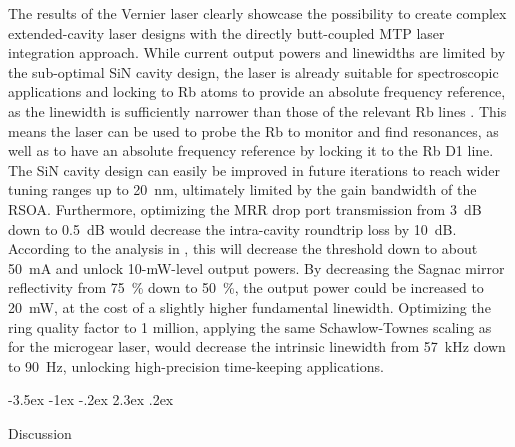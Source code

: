 \documentclass[%
 reprint,
 amsmath,amssymb,
 aps,
]{revtex4-2}
\makeatletter
\renewcommand\section{\@startsection {section}{1}{0pt}%
  {-3.5ex \@plus -1ex \@minus -.2ex}%
  {2.3ex \@plus.2ex}%
  {\normalfont\normalsize\bfseries\raggedright}}
\makeatother
\begin{document}
The results of the Vernier laser clearly showcase the possibility to create complex extended-cavity laser designs with the directly butt-coupled MTP laser integration approach. While current output powers and linewidths are limited by the sub-optimal SiN cavity design, the laser is already suitable for spectroscopic applications and locking to Rb atoms to provide an absolute frequency reference, as the linewidth is sufficiently narrower than those of the relevant Rb lines \cite{heavens1961radiative}. This means the laser can be used to probe the Rb to monitor and find resonances, as well as to have an absolute frequency reference by locking it to the Rb D1 line. The SiN cavity design can easily be improved in future iterations to reach wider tuning ranges up to 20~nm, ultimately limited by the gain bandwidth of the RSOA. Furthermore, optimizing the MRR drop port transmission from 3~dB down to 0.5~dB would decrease the intra-cavity roundtrip loss by 10~dB. According to the analysis in \cite{kiewiet2026micro}, this will decrease the threshold down to about 50~mA and unlock 10-mW-level output powers. By decreasing the Sagnac mirror reflectivity from 75~\% down to 50~\%, the output power could be increased to 20~mW, at the cost of a slightly higher fundamental linewidth. Optimizing the ring quality factor to 1 million, applying the same Schawlow-Townes scaling as for the microgear laser, would decrease the intrinsic linewidth from 57~kHz down to 90~Hz, unlocking high-precision time-keeping applications.

\section{Discussion}
\end{document}
